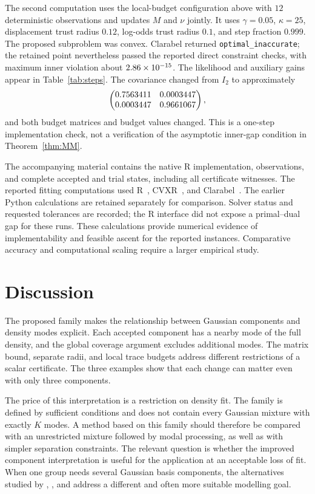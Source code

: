 \documentclass[12pt,a4paper]{article}
\theoremstyle{remark}
\begin{document}
The second computation uses the local-budget configuration above with $12$ deterministic observations and updates $M$ and $\nu$ jointly. It uses $\gamma=0.05$, $\kappa=25$, displacement trust radius $0.12$, log-odds trust radius $0.1$, and step fraction $0.999$. The proposed subproblem was convex. Clarabel returned \texttt{optimal\_inaccurate}; the retained point nevertheless passed the reported direct constraint checks, with maximum inner violation about $2.86\times 10^{-15}$. The likelihood and auxiliary gains appear in Table~\ref{tab:steps}. The covariance changed from $I_2$ to approximately
\[
 \begin{pmatrix}0.7563411&0.0003447\\0.0003447&0.9661067\end{pmatrix},
\]
and both budget matrices and budget values changed. This is a one-step implementation check, not a verification of the asymptotic inner-gap condition in Theorem~\ref{thm:MM}.

The accompanying material contains the native R implementation, observations, and complete accepted and trial states, including all certificate witnesses. The reported fitting computations used R~\RVersion, CVXR~\RCVXRVersion, and Clarabel~\RClarabelVersion. The earlier Python calculations are retained separately for comparison. Solver status and requested tolerances are recorded; the R interface did not expose a primal--dual gap for these runs. These calculations provide numerical evidence of implementability and feasible ascent for the reported instances. Comparative accuracy and computational scaling require a larger empirical study.

\section{Discussion}\label{sec:discussion}

The proposed family makes the relationship between Gaussian components and density modes explicit. Each accepted component has a nearby mode of the full density, and the global coverage argument excludes additional modes. The matrix bound, separate radii, and local trace budgets address different restrictions of a scalar certificate. The three examples show that each change can matter even with only three components.

The price of this interpretation is a restriction on density fit. The family is defined by sufficient conditions and does not contain every Gaussian mixture with exactly $K$ modes. A method based on this family should therefore be compared with an unrestricted mixture followed by modal processing, as well as with simpler separation constraints. The relevant question is whether the improved component interpretation is useful for the application at an acceptable loss of fit. When one group needs several Gaussian basis components, the alternatives studied by \citet{hennig2010}, \citet{chacon2019}, and \citet{tancini2025} address a different and often more suitable modelling goal.
\end{document}
